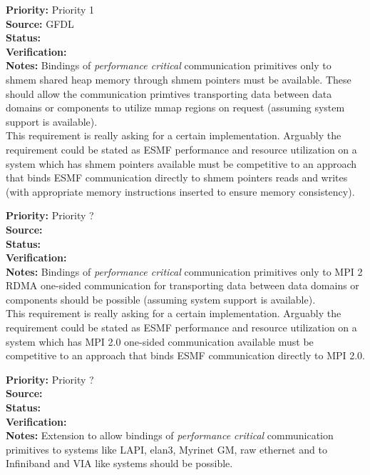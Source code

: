 \begin{reqlist}
{\bf Priority:} Priority 1 \\
{\bf Source:}  GFDL \\
{\bf Status:}  \\
{\bf Verification:} \\
{\bf Notes:} Bindings of {\it performance critical} communication primitives only
to shmem shared heap memory through shmem pointers must be available. These 
should allow the communication primtives transporting data between data domains 
or components to utilize mmap regions on request (assuming system support
is available).\\
This requirement is really asking for a certain implementation.
Arguably the requirement could be stated as ESMF performance
and resource utilization on a system which has shmem pointers available must be
competitive to an approach that binds ESMF communication directly to shmem pointers
reads and writes (with appropriate memory
instructions inserted to ensure memory consistency).
\end{reqlist}

\begin{reqlist}
{\bf Priority:} Priority ? \\
{\bf Source:}  \\
{\bf Status:}  \\
{\bf Verification:} \\
{\bf Notes:} Bindings of {\it performance critical} communication primitives only
to MPI 2 RDMA one-sided communication for transporting data between data domains 
or components should be possible (assuming system support
is available).\\
This requirement is really asking for a certain implementation.
Arguably the requirement could be stated as ESMF performance
and resource utilization on a system which has MPI 2.0 one-sided communication available must be
competitive to an approach that binds ESMF communication directly to MPI 2.0.
\end{reqlist}

\begin{reqlist}
{\bf Priority:} Priority ? \\
{\bf Source:}  \\
{\bf Status:}  \\
{\bf Verification:} \\
{\bf Notes:} Extension to allow bindings of {\it performance critical} communication primitives to
systems like LAPI, elan3, Myrinet GM, raw ethernet and to Infiniband and VIA like systems should be possible.
\end{reqlist}



